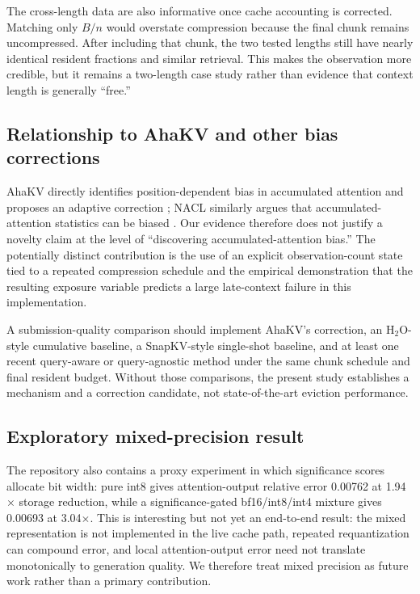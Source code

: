 \documentclass[10pt,twocolumn]{article}
\begin{document}
The cross-length data are also informative once cache accounting is corrected. Matching only $B/n$ would overstate compression because the final chunk remains uncompressed. After including that chunk, the two tested lengths still have nearly identical resident fractions and similar retrieval. This makes the observation more credible, but it remains a two-length case study rather than evidence that context length is generally ``free.''

\subsection{Relationship to AhaKV and other bias corrections}
AhaKV directly identifies position-dependent bias in accumulated attention and proposes an adaptive correction \citep{gu2025ahakv}; NACL similarly argues that accumulated-attention statistics can be biased \citep{chen2024nacl}. Our evidence therefore does not justify a novelty claim at the level of ``discovering accumulated-attention bias.'' The potentially distinct contribution is the use of an explicit observation-count state tied to a repeated compression schedule and the empirical demonstration that the resulting exposure variable predicts a large late-context failure in this implementation.

A submission-quality comparison should implement AhaKV's correction, an H$_2$O-style cumulative baseline, a SnapKV-style single-shot baseline, and at least one recent query-aware or query-agnostic method under the same chunk schedule and final resident budget. Without those comparisons, the present study establishes a mechanism and a correction candidate, not state-of-the-art eviction performance.

\subsection{Exploratory mixed-precision result}
The repository also contains a proxy experiment in which significance scores allocate bit width: pure int8 gives attention-output relative error 0.00762 at 1.94$\times$ storage reduction, while a significance-gated bf16/int8/int4 mixture gives 0.00693 at 3.04$\times$. This is interesting but not yet an end-to-end result: the mixed representation is not implemented in the live cache path, repeated requantization can compound error, and local attention-output error need not translate monotonically to generation quality. We therefore treat mixed precision as future work rather than a primary contribution.
\end{document}
